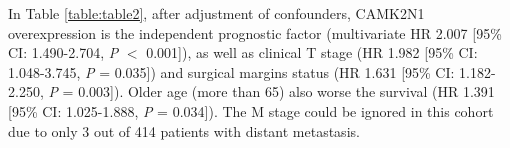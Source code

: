 \documentclass[jpm,article,submit,moreauthors,pdftex]{Definitions/mdpi}
\begin{document}

In Table \ref{table:table2}, %
after adjustment of confounders, \acrshort{CAMK2N1} overexpression is the independent prognostic factor (multivariate HR 2.007 [95\% CI: 1.490-2.704, \textit{P} $<$ 0.001]), as well as clinical T stage (HR 1.982 [95\% CI: 1.048-3.745, \textit{P} = 0.035]) and surgical margins status (HR 1.631 [95\% CI: 1.182-2.250, \textit{P} = 0.003]). 
Older age (more than 65) also worse the survival (HR 1.391 [95\% CI: 1.025-1.888, \textit{P} = 0.034]). 
The M stage could be ignored in this cohort due to only 3 out of 414 patients with distant metastasis.
\end{document}
